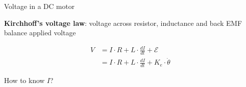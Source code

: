 \documentclass[compress]{beamer}
\begin{document}
\begin{frame}{Voltage in a DC motor}

    \begin{center}
    \end{center}

\textbf{Kirchhoff's voltage law}: voltage across resistor, inductance and
back EMF balance applied voltage

\begin{align*}
    V &= I \cdot R + L \cdot \frac{dI}{dt} + \mathcal{E} \\
      &= I \cdot R + L \cdot \frac{dI}{dt} + K_e \cdot \dot\theta
\end{align*}

\pause

How to know $I$?

\end{frame}
\end{document}
